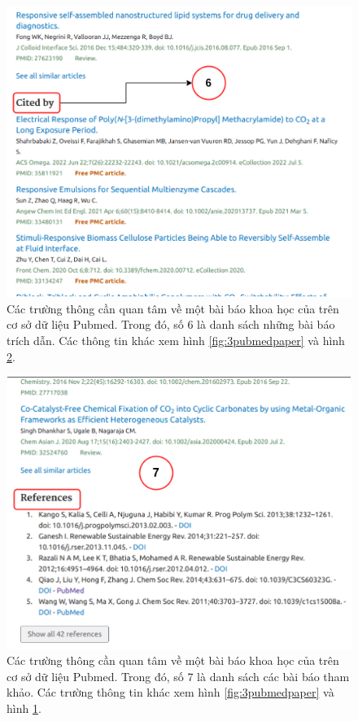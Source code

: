 \documentclass[../DoAn.tex]{subfiles}
\begin{document}
\begin{figure}
\centering
\includegraphics[width=1.0\linewidth]{Hinh_ve/Pubmedpaper2.png}
\caption{Các trường thông cần quan tâm về một bài báo khoa học của trên cơ sở dữ liệu Pubmed. Trong đó, số 6 là danh sách những bài báo trích dẫn. Các thông tin khác xem hình \ref{fig:3pubmedpaper} và hình \ref{fig:3pubmedpaper3}.}
\label{fig:3pubmedpaper2}
\end{figure}

\begin{figure}
\centering
\includegraphics[width=1.0\linewidth]{Hinh_ve/PubmedPaper3.png}
\caption{Các trường thông cần quan tâm về một bài báo khoa học của trên cơ sở dữ liệu Pubmed. Trong đó, số 7 là danh sách các bài báo tham khảo. Các trường thông tin khác xem hình \ref{fig:3pubmedpaper} và hình \ref{fig:3pubmedpaper2}. }
\label{fig:3pubmedpaper3}
\end{figure}
\end{document}
